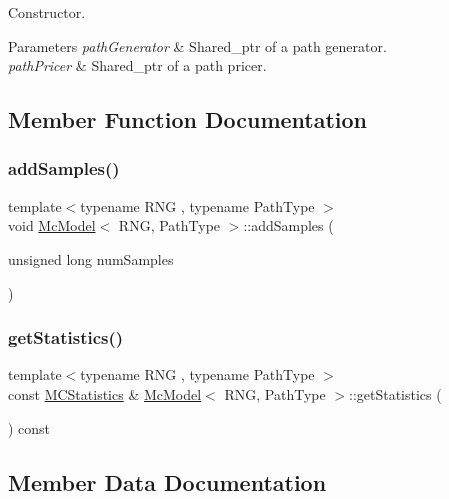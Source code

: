 Constructor. 


\begin{DoxyParams}{Parameters}
{\em path\+Generator} & Shared\+\_\+ptr of a path generator. \\
\hline
{\em path\+Pricer} & Shared\+\_\+ptr of a path pricer. \\
\hline
\end{DoxyParams}


\subsection{Member Function Documentation}
\hypertarget{class_mc_model_a6ce369cb607a221259e4a93bb63ea4ec}{}\label{class_mc_model_a6ce369cb607a221259e4a93bb63ea4ec} 
\subsubsection{\texorpdfstring{add\+Samples()}{addSamples()}}
{\footnotesize\ttfamily template$<$typename R\+NG , typename Path\+Type $>$ \\
void \hyperlink{class_mc_model}{Mc\+Model}$<$ R\+NG, Path\+Type $>$\+::add\+Samples (\begin{DoxyParamCaption}\item[{unsigned long}]{num\+Samples }\end{DoxyParamCaption})}

\hypertarget{class_mc_model_a07af7562a83c0bc16ba822ac52154684}{}\label{class_mc_model_a07af7562a83c0bc16ba822ac52154684} 
\subsubsection{\texorpdfstring{get\+Statistics()}{getStatistics()}}
{\footnotesize\ttfamily template$<$typename R\+NG , typename Path\+Type $>$ \\
const \hyperlink{class_m_c_statistics}{M\+C\+Statistics} \& \hyperlink{class_mc_model}{Mc\+Model}$<$ R\+NG, Path\+Type $>$\+::get\+Statistics (\begin{DoxyParamCaption}{ }\end{DoxyParamCaption}) const}



\subsection{Member Data Documentation}
\hypertarget{class_mc_model_abb4ba15045ba3c05d2f54340a63a1000}{}\label{class_mc_model_abb4ba15045ba3c05d2f54340a63a1000} 
